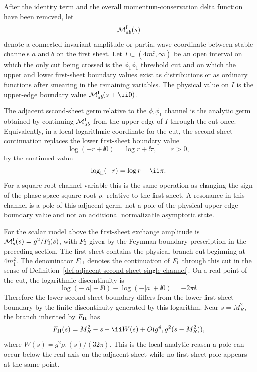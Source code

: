 \begin{definition}
\label{def:adjacent-second-sheet-single-channel}
After the identity term and the overall momentum-conservation delta function
have been removed, let
\[
  \mathcal M_{ab}^{\rm I}(s)
\]
denote a connected invariant amplitude or partial-wave coordinate between
stable channels \(a\) and \(b\) on the first sheet.  Let
\(I\subset(4m_1^2,\infty)\) be an open interval on which the only cut being
crossed is the \(\phi_1\phi_1\) threshold cut and on which the upper and lower
first-sheet boundary values exist as distributions or as ordinary functions
after smearing in the remaining variables.  The physical value on \(I\) is the
upper-edge boundary value \(\mathcal M_{ab}^{\rm I}(s+\ii0)\).

The adjacent second-sheet germ relative to the \(\phi_1\phi_1\) channel is the
analytic germ obtained by continuing \(\mathcal M_{ab}^{\rm I}\) from the
upper edge of \(I\) through the cut once.  Equivalently, in a local logarithmic
coordinate for the cut, the second-sheet continuation replaces the lower
first-sheet boundary value
\[
  \log(-r+\ii0)=\log r+\ii\pi,\qquad r>0,
\]
by the continued value
\[
  \log_{\rm II}(-r)=\log r-\ii\pi .
\]
For a square-root channel variable this is the same operation as changing the
sign of the phase-space square root \(\rho_1\) relative to the first sheet.
A resonance in this channel is a pole of this adjacent germ, not a pole of the
physical upper-edge boundary value and not an additional normalizable
asymptotic state.
\end{definition}

For the scalar model above the first-sheet exchange amplitude is
\(\mathcal M_s^{\rm I}(s)=g^2/F_{\rm I}(s)\), with \(F_{\rm I}\) given by the
Feynman boundary prescription in the preceding section.  The first sheet
contains the physical branch cut beginning at \(4m_1^2\).  The denominator
\(F_{\rm II}\) denotes the continuation of \(F_{\rm I}\) through this cut in
the sense of
Definition~\ref{def:adjacent-second-sheet-single-channel}.  On a real point
of the cut, the logarithmic discontinuity is
\[
  \log(-|a|-\ii0)-\log(-|a|+\ii0)=-2\pi\ii .
\]
Therefore the lower second-sheet boundary differs from the lower first-sheet
boundary by the finite discontinuity generated by this logarithm.  Near
\(s=M_R^2\), the branch inherited by \(F_{\rm II}\) has
\[
  F_{\rm II}(s)
  =
  M_R^2-s-\ii W(s)+O(g^4,g^2(s-M_R^2)),
\]
where \(W(s)=g^2\rho_1(s)/(32\pi)\).  This is the local analytic reason a pole
can occur below the real axis on the adjacent sheet while no first-sheet pole
appears at the same point.

